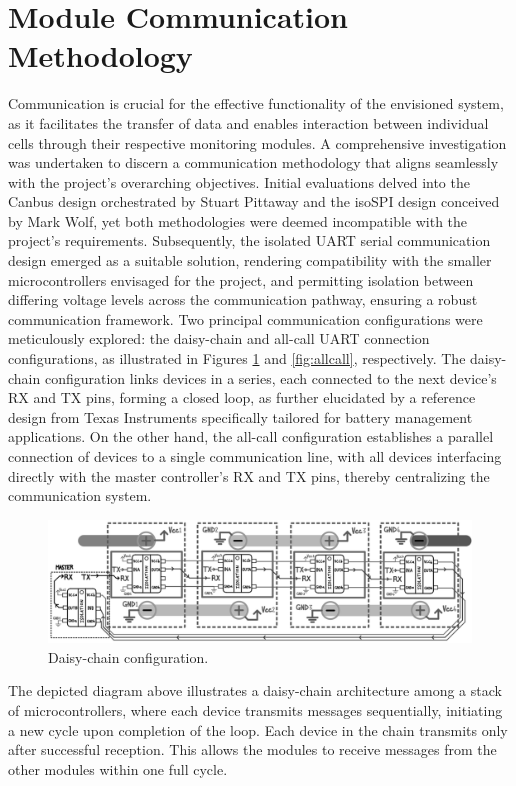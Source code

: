 \section{Module Communication Methodology}\label{sec:commsMeth}
Communication is crucial for the effective functionality of the envisioned system, as it facilitates the transfer of data and enables interaction between individual cells through their respective monitoring modules. A comprehensive investigation was undertaken to discern a communication methodology that aligns seamlessly with the project's overarching objectives. Initial evaluations delved into the Canbus design orchestrated by Stuart Pittaway\cite{stuart_pittaway} and the isoSPI design conceived by Mark Wolf\cite{mark_wolf}, yet both methodologies were deemed incompatible with the project's requirements. Subsequently, the isolated UART serial communication design emerged as a suitable solution, rendering compatibility with the smaller microcontrollers envisaged for the project, and permitting isolation between differing voltage levels across the communication pathway, ensuring a robust communication framework\cite{TIDA00163}.\newline\newline
\noindent
Two principal communication configurations were meticulously explored: the daisy-chain and all-call UART connection configurations, as illustrated in Figures \ref{fig:daisy} and \ref{fig:allcall}, respectively. The daisy-chain configuration links devices in a series, each connected to the next device's RX and TX pins, forming a closed loop, as further elucidated by a reference design from Texas Instruments specifically tailored for battery management applications\cite{TI_UART_SPI_bridgee}. On the other hand, the all-call configuration establishes a parallel connection of devices to a single communication line, with all devices interfacing directly with the master controller's RX and TX pins, thereby centralizing the communication system.

\begin{figure}[!htb]
\centering
\includegraphics[width=1.0\linewidth]{Figures/DaisyChain.png}
\caption{Daisy-chain configuration.}
\label{fig:daisy}
\end{figure}
\noindent
The depicted diagram above illustrates a daisy-chain architecture among a stack of microcontrollers, where each device transmits messages sequentially, initiating a new cycle upon completion of the loop. Each device in the chain transmits only after successful reception. This allows the modules to receive messages from the other modules within one full cycle.

